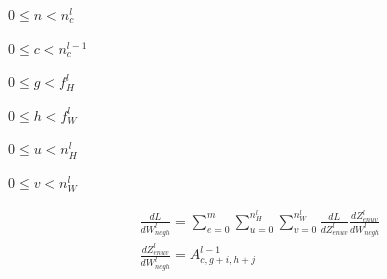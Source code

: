 \documentclass[12pt]{article}
\begin{document}
$0 \le n < n_c^l$

$0 \le c < n_c^{l-1}$

$0 \le g < f_H^l$

$0 \le h < f_W^l$

$0 \le u < n_H^l$

$0 \le v < n_W^l$

\begin{gather*}
    \frac{dL}{dW^l_{ncgh}} = \sum_{e=0}^m \sum_{u=0}^{n_H^l} \sum_{v=0}^{n_W^l} \frac{dL}{dZ^l_{enuv}}
    \frac{dZ^l_{enuv}}{dW^l_{ncgh}}\\
    \frac{dZ^l_{enuv}}{dW^l_{ncgh}} = A^{l-1}_{c,g+i,h+j}\\
\end{gather*}
\end{document}
